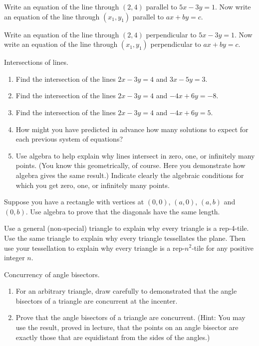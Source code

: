 \begin{prob}
Write an equation of the line through $(2,4)$ parallel to $5x-3y=1$.  
Now write an equation of the line through $(x_1,y_1)$ parallel to $ax+by=c$. 
\end{prob}

\begin{prob}
Write an equation of the line through $(2,4)$ perpendicular to $5x-3y=1$.  
Now write an equation of the line through $(x_1,y_1)$ perpendicular to $ax+by=c$. 
\end{prob}

\begin{prob}
Intersections of lines.  
\begin{enumerate}
\item Find the intersection of the lines $2x-3y=4$ and $3x-5y=3$.  
\item Find the intersection of the lines $2x-3y=4$ and $-4x+6y=-8$.
\item Find the intersection of the lines $2x-3y=4$ and $-4x+6y=5$.
\item How might you have predicted in advance how many solutions to expect for each previous system of equations?
\item Use algebra to help explain why lines intersect in zero, one, or infinitely many points.  (You know this geometrically, of course.  Here you demonstrate how algebra gives the same result.)  Indicate clearly the algebraic conditions
for which you get zero, one, or infinitely many points.  
\end{enumerate}
\end{prob}

\begin{prob}
Suppose you have a rectangle with vertices at $(0,0)$, $(a,0)$,
$(a,b)$ and $(0,b)$. Use algebra to prove that the diagonals have the
same length.
\end{prob}

\begin{prob}
Use a general (non-special) triangle to explain why every triangle is a rep-4-tile.  
Use the same triangle to explain why every triangle tessellates the plane.  Then use your tessellation to explain why every triangle is a rep-$n^2$-tile for any positive integer $n$. 
\end{prob}

\begin{prob} 
Concurrency of angle bisectors. 
\begin{enumerate}
\item For an arbitrary triangle, draw carefully to demonstrated that the angle bisectors of a triangle are concurrent at the incenter.   
\item Prove that the angle bisectors of a triangle are concurrent.  (Hint:  You may use the result, proved in lecture, that the points on an angle bisector are exactly those that are equidistant from the sides of the angles.)  
\end{enumerate}
\end{prob} 

